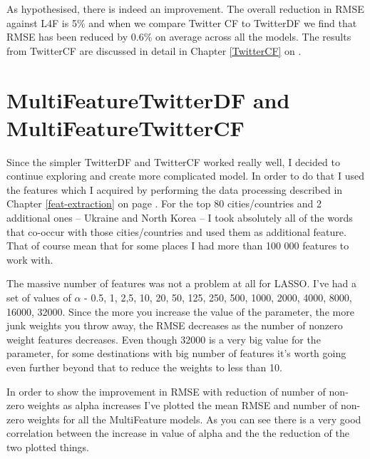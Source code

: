\documentclass[minf,twoside,singlespacing,parskip,frontabs]{infthesis}
\begin{document}
As hypothesised, there is indeed an improvement. The overall reduction in RMSE against L4F is 5\% and when we compare Twitter CF to TwitterDF we find that RMSE has been reduced by 0.6\% on average across all the models. The results from TwitterCF are discussed in detail in Chapter \ref{TwitterCF} on \pageref{TwitterCF}. 


\section{MultiFeatureTwitterDF and MultiFeatureTwitterCF}
\label{sec:multi}

Since the simpler TwitterDF and TwitterCF worked really well, I decided to continue exploring and create more complicated model. In order to do that I used the features which I acquired by performing the data processing described in Chapter \ref{feat-extraction} on page \pageref{feat-extraction}. For the top 80 cities/countries and 2 additional ones -- Ukraine and North Korea -- I took absolutely all of the words that co-occur with those cities/countries and used them as additional feature. That of course mean that for some places I had more than 100 000 features to work with. 


The massive number of features was not a problem at all for LASSO. I've had a set of values of $\alpha$ - 0.5, 1, 2,5, 10, 20, 50, 125, 250, 500, 1000, 2000, 4000, 8000, 16000, 32000. Since the more you increase the value of the parameter, the more junk weights you throw away, the RMSE decreases as the number of nonzero weight features decreases. Even though 32000 is a very big value for the parameter, for some destinations with big number of features it's worth going even further beyond that to reduce the weights to less than 10.


In order to show the improvement in RMSE with reduction of number of non-zero weights as alpha increases I've plotted the mean RMSE and number of non-zero weights for all the MultiFeature models. As you can see there is a very good correlation between the increase in value of alpha and the the reduction of the two plotted things. 
\end{document}
